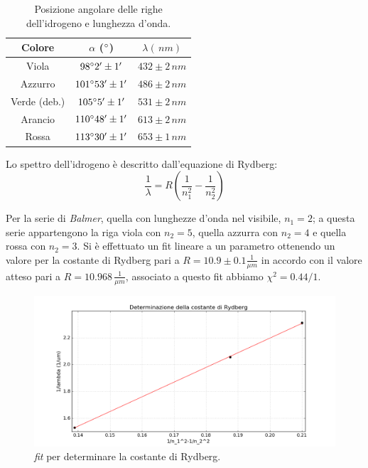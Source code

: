 \documentclass[10pt,a4paper]{article}
\begin{document}
\begin{table}[!htb]
\centering
\begin{tabular}{|c|c|c|}
\hline
Colore & $\alpha$ ($\degree$) & $\lambda (\,nm)$\\
\hline 
Viola & $98 \degree 2' \pm 1'$ & $432 \pm 2 \,nm$ \\ 
\hline 
Azzurro & $101 \degree 53' \pm 1'$ & $486 \pm 2 \,nm$ \\ 
\hline 
Verde (deb.)& $105 \degree 5' \pm 1'$ & $531 \pm 2 \,nm$ \\ 
\hline
Arancio & $110 \degree 48' \pm 1'$ & $613 \pm 2 \,nm$ \\ 
\hline 
Rossa & $113 \degree 30' \pm 1'$ & $653 \pm 1 \,nm$ \\ 
\hline 
\end{tabular} 
\caption{Posizione angolare delle righe dell'idrogeno e lunghezza d'onda.}\label{idrogeno}
\end{table}

Lo spettro dell'idrogeno è descritto dall'equazione di Rydberg:
\begin{equation}
\frac{1}{\lambda}= R \left( \frac{1}{n_{1}^2}-\frac{1}{n_{2}^2} \right)
\end{equation}

Per la serie di \emph{Balmer}, quella con lunghezze d'onda nel visibile, $n_1=2$; a questa serie appartengono la riga viola con $n_2=5$, quella azzurra con $n_2=4$ e quella rossa con $n_2=3$. Si è effettuato un fit lineare a un parametro ottenendo un valore per la costante di Rydberg pari a $R = 10.9 \pm 0.1 \frac{1}{\mu m}$ in accordo con il valore atteso pari a $R=10.968\, \frac{1}{\mu m}$, associato a questo fit abbiamo $\chi^2 = 0.44/1$.\\

\begin{figure}[!htb]
  \centering
  \includegraphics[scale=0.6]{ryd.png}
\caption{\emph{fit} per determinare la costante di Rydberg.}
\label{pin}
\end{figure}
\end{document}
